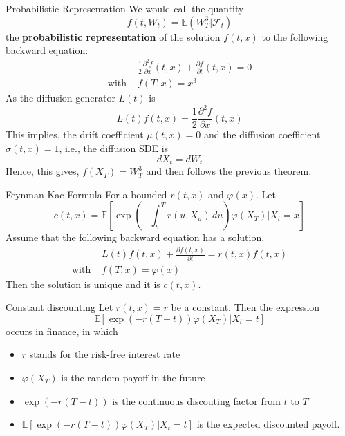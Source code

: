 \documentclass[12pt,a4paper]{article}
\newcommand{\E}{\mathbb{E}}
\begin{document}
    \begin{example}{Probabilistic Representation}{}
        We would call the quantity
        $$
        f(t,W_t) = \E(W_T^3|\mathscr{F}_t)
        $$
        the \textbf{probabilistic representation} of the solution $f(t,x)$ to the following backward equation:
        \begin{align*}
             &\frac{1}{2}\frac{\partial^2 f}{\partial x}(t,x) + \frac{\partial f}{\partial t} (t,x) =0\\
             \text{with } & f(T,x) = x^3
        \end{align*}
        As the diffusion generator $L(t)$ is
        $$
        L(t)f(t,x) = \frac{1}{2}\frac{\partial^2 f}{\partial x}(t,x)
        $$
        This implies, the drift coefficient $\mu(t,x)=0$ and the diffusion coefficient $\sigma(t,x) = 1$, i.e., the diffusion SDE is
        $$
        dX_t = dW_t
        $$
        Hence, this gives, $f(X_T) = W_T^3$ and then follows the previous theorem.
    \end{example}
    \pagebreak
    \begin{theorem}{Feynman-Kac Formula}{}
        For a bounded $r(t,x)$ and $\varphi(x)$. Let
        $$
        c(t,x) = \E\left[\exp\left(-\int_t^T r(u,X_u)\, du\right)\varphi(X_T)\bigg|X_t=x\right]
        $$
        Assume that the following backward equation has a solution,
        \begin{align*}
            & L(t)f(t,x) + \frac{\partial f(t,x)}{\partial t} = r(t,x)f(t,x)\\
            \text{with } & f(T,x) = \varphi(x)
        \end{align*}
        Then the solution is unique and it is $c(t,x)$.
    \end{theorem}
    \begin{remark}{Constant discounting}{}
        Let $r(t,x)=r$ be a constant. Then the expression
        $$
        \E\left[\exp\left(-r(T-t)\right)\varphi(X_T) \bigg|X_t=t\right]
        $$
        occurs in finance, in which 
        \begin{itemize}
            \item $r$ stands for the risk-free interest rate
            \item $\varphi(X_T)$ is the random payoff in the future
            \item $\exp\left(-r(T-t)\right)$ is the continuous discouting factor from $t$ to $T$
            \item $\E\left[\exp\left(-r(T-t)\right)\varphi(X_T) \bigg|X_t=t\right]$ is the expected discounted payoff.
        \end{itemize}
    \end{remark}
    \pagebreak
\end{document}
